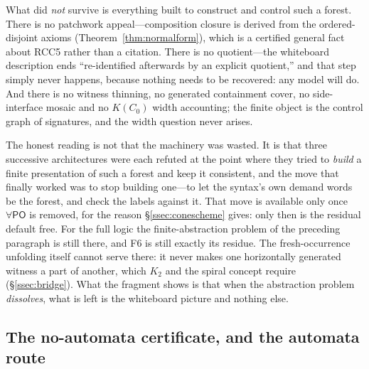 \documentclass[11pt]{article}
\newcommand{\PO}{\mathsf{PO}}
\theoremstyle{plain}
\theoremstyle{definition}
\begin{document}
What did \emph{not} survive is everything built to construct and control such a
forest. There is no patchwork appeal---composition closure is derived from the
ordered-disjoint axioms (Theorem~\ref{thm:normalform}), which is a certified
general fact about RCC5 rather than a citation. There is no
quotient---the whiteboard description ends ``re-identified afterwards by an
explicit quotient,'' and that step simply never happens, because nothing needs
to be recovered: any model will do. And there is no witness thinning, no
generated containment cover, no side-interface mosaic and no $K(C_0)$ width
accounting; the finite object is the control graph of signatures, and the width
question never arises.

The honest reading is not that the machinery was wasted. It is that three
successive architectures were each refuted at the point where they tried to
\emph{build} a finite presentation of such a forest and keep it consistent, and
the move that finally worked was to stop building one---to let the syntax's own
demand words be the forest, and check the labels against it. That move is
available only once $\forall\PO$ is removed, for the reason
\S\ref{ssec:conescheme} gives: only then is the residual default free. For
the full logic the finite-abstraction problem of the preceding paragraph is
still there, and F6 is still exactly its residue. The fresh-occurrence
unfolding itself cannot serve there: it never makes one horizontally generated
witness a part of another, which $K_2$ and the spiral concept require
(\S\ref{ssec:bridge}). What the fragment shows is
that when the abstraction problem \emph{dissolves}, what is left is the
whiteboard picture and nothing else.

\subsection{The no-automata certificate, and the automata route}
\label{ssec:approach-automata}
\end{document}
